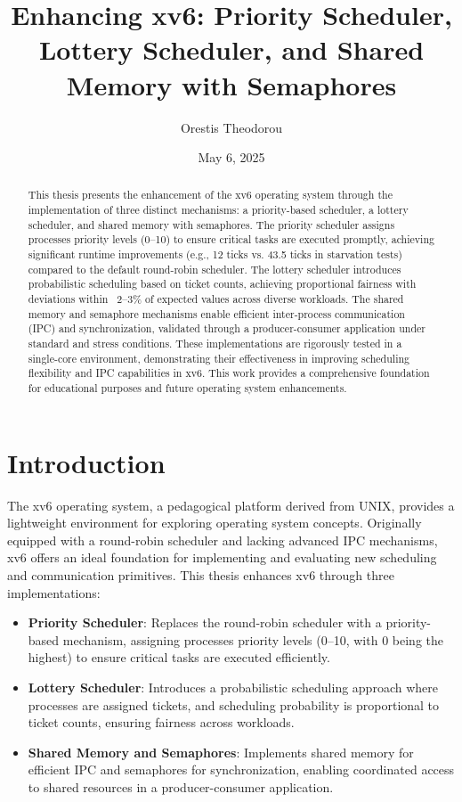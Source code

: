 \documentclass[12pt]{article}
\begin{document}
\title{Enhancing xv6: Priority Scheduler, Lottery Scheduler, and Shared Memory with Semaphores}
\author{Orestis Theodorou}
\date{May 6, 2025}
\maketitle

\begin{abstract}
This thesis presents the enhancement of the xv6 operating system through the implementation of three distinct mechanisms: a priority-based scheduler, a lottery scheduler, and shared memory with semaphores. The priority scheduler assigns processes priority levels (0–10) to ensure critical tasks are executed promptly, achieving significant runtime improvements (e.g., 12 ticks vs. 43.5 ticks in starvation tests) compared to the default round-robin scheduler. The lottery scheduler introduces probabilistic scheduling based on ticket counts, achieving proportional fairness with deviations within ~2–3\% of expected values across diverse workloads. The shared memory and semaphore mechanisms enable efficient inter-process communication (IPC) and synchronization, validated through a producer-consumer application under standard and stress conditions. These implementations are rigorously tested in a single-core environment, demonstrating their effectiveness in improving scheduling flexibility and IPC capabilities in xv6. This work provides a comprehensive foundation for educational purposes and future operating system enhancements.
\end{abstract}

\section{Introduction}
\label{sec:introduction}

The xv6 operating system, a pedagogical platform derived from UNIX, provides a lightweight environment for exploring operating system concepts. Originally equipped with a round-robin scheduler and lacking advanced IPC mechanisms, xv6 offers an ideal foundation for implementing and evaluating new scheduling and communication primitives. This thesis enhances xv6 through three implementations:

\begin{itemize}
  \item \textbf{Priority Scheduler}: Replaces the round-robin scheduler with a priority-based mechanism, assigning processes priority levels (0–10, with 0 being the highest) to ensure critical tasks are executed efficiently.
  \item \textbf{Lottery Scheduler}: Introduces a probabilistic scheduling approach where processes are assigned tickets, and scheduling probability is proportional to ticket counts, ensuring fairness across workloads.
  \item \textbf{Shared Memory and Semaphores}: Implements shared memory for efficient IPC and semaphores for synchronization, enabling coordinated access to shared resources in a producer-consumer application.
\end{itemize}
\end{document}
